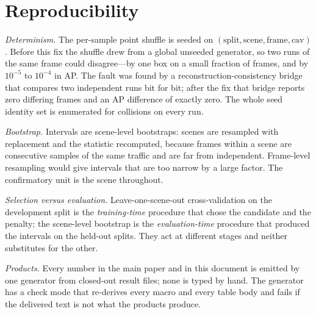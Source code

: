 \documentclass[journal]{IEEEtran}
\begin{document}
\section{Reproducibility}
\emph{Determinism.} The per-sample point shuffle is seeded on
$(\text{split}, \text{scene}, \text{frame}, \text{cav})$. Before this fix the shuffle drew from a
global unseeded generator, so two runs of the same frame could disagree---by one box on a small
fraction of frames, and by $10^{-5}$ to $10^{-4}$ in AP. The fault was found by a
reconstruction-consistency bridge that compares two independent runs bit for bit; after the fix that
bridge reports zero differing frames and an AP difference of exactly zero. The whole seed identity
set is enumerated for collisions on every run.

\emph{Bootstrap.} Intervals are scene-level bootstraps: scenes are resampled with replacement and
the statistic recomputed, because frames within a scene are consecutive samples of the same traffic
and are far from independent. Frame-level resampling would give intervals that are too narrow by a
large factor. The confirmatory unit is the scene throughout.

\emph{Selection versus evaluation.} Leave-one-scene-out cross-validation on the development split is
the \emph{training-time} procedure that chose the candidate and the penalty; the scene-level
bootstrap is the \emph{evaluation-time} procedure that produced the intervals on the held-out
splits. They act at different stages and neither substitutes for the other.

\emph{Products.} Every number in the main paper and in this document is emitted by one generator
from closed-out result files; none is typed by hand. The generator has a check mode that
re-derives every macro and every table body and fails if the delivered text is not what the products
produce.
\end{document}
